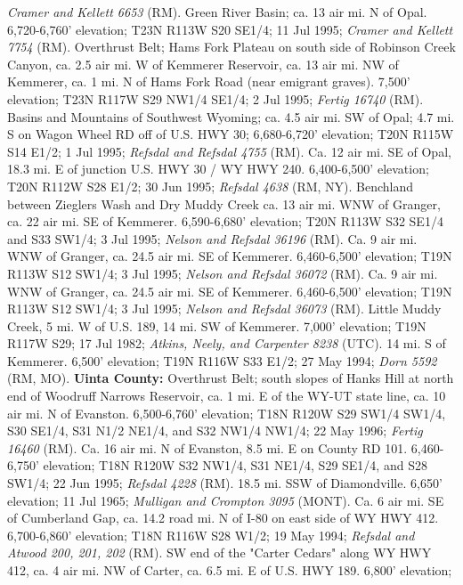 \textit{Cramer and Kellett 6653} (RM).
Green River Basin; ca. 13 air mi. N of Opal. 6,720-6,760' elevation;
T23N R113W S20 SE1/4; 11 Jul 1995; \textit{Cramer and Kellett 7754} (RM).
Overthrust Belt; Hams Fork Plateau on south side of Robinson Creek Canyon, ca.
2.5 air mi. W of Kemmerer Reservoir, ca. 13 air mi. NW of Kemmerer, ca. 1 mi. N
of Hams Fork Road (near emigrant graves). 7,500' elevation;
T23N R117W S29 NW1/4 SE1/4; 2 Jul 1995; \textit{Fertig 16740} (RM).
Basins and Mountains of Southwest Wyoming; ca. 4.5 air mi. SW of Opal; 4.7 mi. S
on Wagon Wheel RD off of U.S. HWY 30; 6,680-6,720' elevation;
T20N R115W S14 E1/2; 1 Jul 1995; \textit{Refsdal and Refsdal 4755} (RM).
Ca. 12 air mi. SE of Opal, 18.3 mi. E of junction U.S. HWY 30 / WY HWY 240.
6,400-6,500' elevation; T20N R112W S28 E1/2; 30 Jun 1995;
\textit{Refsdal 4638} (RM, NY).
Benchland between Zieglers Wash and Dry Muddy Creek ca. 13 air mi. WNW of
Granger, ca. 22 air mi. SE of Kemmerer. 6,590-6,680' elevation;
T20N R113W S32 SE1/4 and S33 SW1/4; 3 Jul 1995;
\textit{Nelson and Refsdal 36196} (RM).
Ca. 9 air mi. WNW of Granger, ca. 24.5 air mi. SE of Kemmerer.
6,460-6,500' elevation; T19N R113W S12 SW1/4; 3 Jul 1995;
\textit{Nelson and Refsdal 36072} (RM).
Ca. 9 air mi. WNW of Granger, ca. 24.5 air mi. SE of Kemmerer.
6,460-6,500' elevation; T19N R113W S12 SW1/4; 3 Jul 1995;
\textit{Nelson and Refsdal 36073} (RM).
Little Muddy Creek, 5 mi. W of U.S. 189, 14 mi. SW of Kemmerer. 7,000' elevation;
T19N R117W S29; 17 Jul 1982; \textit{Atkins, Neely, and Carpenter 8238} (UTC).
14 mi. S of Kemmerer. 6,500' elevation; T19N R116W S33 E1/2; 27 May 1994;
\textit{Dorn 5592} (RM, MO).
  \textbf{Uinta County:}
Overthrust Belt; south slopes of Hanks Hill at north end of Woodruff Narrows
Reservoir, ca. 1 mi. E of the WY-UT state line, ca. 10 air mi. N of Evanston.
6,500-6,760' elevation; T18N R120W S29 SW1/4 SW1/4, S30 SE1/4, S31 N1/2 NE1/4,
and S32 NW1/4 NW1/4; 22 May 1996; \textit{Fertig 16460} (RM).
Ca. 16 air mi. N of Evanston, 8.5 mi. E on County RD 101.
6,460-6,750' elevation; T18N R120W S32 NW1/4, S31 NE1/4, S29 SE1/4, and
S28 SW1/4; 22 Jun 1995; \textit{Refsdal 4228} (RM).
18.5 mi. SSW of Diamondville. 6,650’ elevation; 11 Jul 1965;
\textit{Mulligan and Crompton 3095} (MONT).
Ca. 6 air mi. SE of Cumberland Gap, ca. 14.2 road mi. N of I-80 on east side of
WY HWY 412. 6,700-6,860' elevation; T18N R116W S28 W1/2; 19 May 1994;
\textit{Refsdal and Atwood 200, 201, 202} (RM).
SW end of the "Carter Cedars" along WY HWY 412, ca. 4 air mi. NW of Carter,
ca. 6.5 mi. E of U.S. HWY 189. 6,800' elevation;
